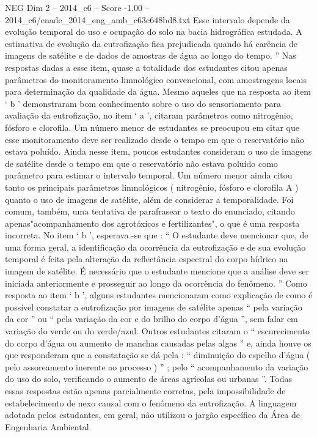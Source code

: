 \begin{textsample}{NEG Dim 2 – 2014\_c6 – Score -1.00 – 2014\_c6/enade\_2014\_eng\_amb\_c63c648bd8.txt}
Esse intervalo depende da evolução temporal do uso e ocupação do solo na bacia hidrográfica estudada.
A estimativa de evolução da eutrofização fica prejudicada quando há carência de imagens de satélite e de dados de amostras de água ao longo do tempo. ” Nas respostas dadas a esse item, quase a totalidade dos estudantes citou apenas parâmetros do monitoramento limnológico convencional, com amostragens locais para determinação da qualidade da água.
Mesmo aqueles que na resposta ao item ‘ b ’ demonstraram bom conhecimento sobre o uso do sensoriamento para avaliação da eutrofização, no item ‘ a ’, citaram parâmetros como nitrogênio, fósforo e clorofila.
Um número menor de estudantes se preocupou em citar que esse monitoramento deve ser realizado desde o tempo em que o reservatório não estava poluído.
Ainda nesse item, poucos estudantes consideram o uso de imagens de satélite desde o tempo em que o reservatório não estava poluído como parâmetro para estimar o intervalo temporal.
Um número menor ainda citou tanto os principais parâmetros limnológicos ( nitrogênio, fósforo e clorofila A ) quanto o uso de imagens de satélite, além de considerar a temporalidade.
Foi comum, também, uma tentativa de parafrasear o texto do enunciado, citando apenas"acompanhamento dos agrotóxicos e fertilizantes", o que é uma resposta incorreta.
No item ‘ b ’, esperava -se que : “ O estudante deve mencionar que, de uma forma geral, a identificação da ocorrência da eutrofização e de sua evolução temporal é feita pela alteração da reflectância espectral do corpo hídrico na imagem de satélite.
É necessário que o estudante mencione que a análise deve ser iniciada anteriormente e prosseguir ao longo da ocorrência do fenômeno. ” Como resposta ao item ‘ b ’, alguns estudantes mencionaram como explicação de como é possível constatar a eutrofização por imagens de satélite apenas “ pela variação da cor ” ou “ pela variação da cor e do brilho do corpo d’água ”, sem falar em variação do verde ou do verde/azul.
Outros estudantes citaram o “ escurecimento do corpo d’água ou aumento de manchas causadas pelas algas ” e, ainda houve os que responderam que a constatação se dá pela : “ diminuição do espelho d’água ( pelo assoreamento inerente ao processo ) ” ; pelo “ acompanhamento da variação do uso do solo, verificando o aumento de áreas agrícolas ou urbanas ”.
Todas essas respostas estão apenas parcialmente corretas, pela impossibilidade de estabelecimento de nexo causal com o fenômeno da eutrofização.
A linguagem adotada pelos estudantes, em geral, não utilizou o jargão específico da Área de Engenharia Ambiental.

\end{textsample}
